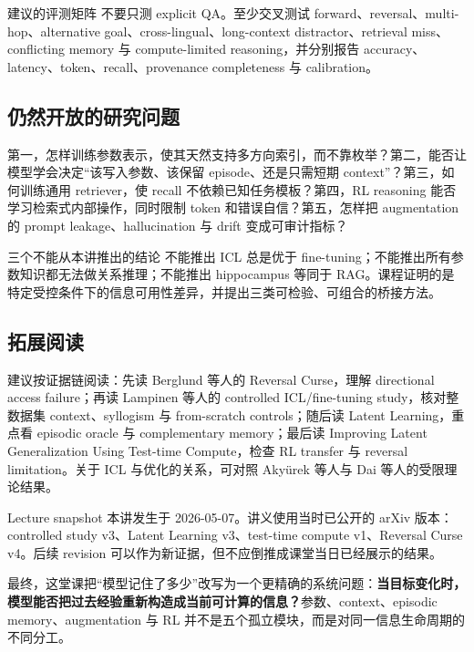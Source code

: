 \documentclass[a4paper]{article}
\begin{document}
\begin{knowledgebox}{建议的评测矩阵}
不要只测 explicit QA。至少交叉测试 forward、reversal、multi-hop、alternative goal、cross-lingual、long-context distractor、retrieval miss、conflicting memory 与 compute-limited reasoning，并分别报告 accuracy、latency、token、recall、provenance completeness 与 calibration。
\end{knowledgebox}

\subsection{仍然开放的研究问题}

第一，怎样训练参数表示，使其天然支持多方向索引，而不靠枚举？第二，能否让模型学会决定“该写入参数、该保留 episode、还是只需短期 context”？第三，如何训练通用 retriever，使 recall 不依赖已知任务模板？第四，RL reasoning 能否学习检索式内部操作，同时限制 token 和错误自信？第五，怎样把 augmentation 的 prompt leakage、hallucination 与 drift 变成可审计指标？

\begin{warningbox}{三个不能从本讲推出的结论}
不能推出 ICL 总是优于 fine-tuning；不能推出所有参数知识都无法做关系推理；不能推出 hippocampus 等同于 RAG。课程证明的是特定受控条件下的信息可用性差异，并提出三类可检验、可组合的桥接方法。
\end{warningbox}

\subsection{拓展阅读}

建议按证据链阅读：先读 Berglund 等人的 Reversal Curse，理解 directional access failure；再读 Lampinen 等人的 controlled ICL/fine-tuning study，核对整数据集 context、syllogism 与 from-scratch controls；随后读 Latent Learning，重点看 episodic oracle 与 complementary memory；最后读 Improving Latent Generalization Using Test-time Compute，检查 RL transfer 与 reversal limitation。关于 ICL 与优化的关系，可对照 Akyürek 等人与 Dai 等人的受限理论结果。

\begin{knowledgebox}{Lecture snapshot}
本讲发生于 2026-05-07。讲义使用当时已公开的 arXiv 版本：controlled study v3、Latent Learning v3、test-time compute v1、Reversal Curse v4。后续 revision 可以作为新证据，但不应倒推成课堂当日已经展示的结果。
\end{knowledgebox}

最终，这堂课把“模型记住了多少”改写为一个更精确的系统问题：\textbf{当目标变化时，模型能否把过去经验重新构造成当前可计算的信息？}参数、context、episodic memory、augmentation 与 RL 并不是五个孤立模块，而是对同一信息生命周期的不同分工。
\end{document}
